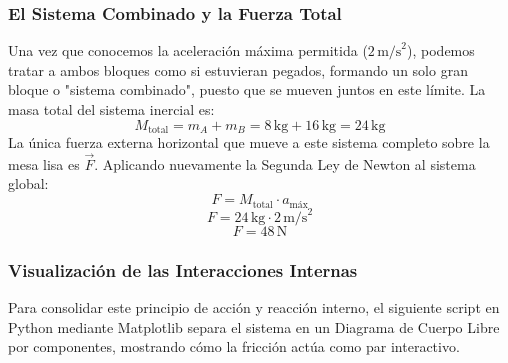 \documentclass[12pt]{article}
\begin{document}
\subsubsection*{El Sistema Combinado y la Fuerza Total}
Una vez que conocemos la aceleración máxima permitida ($2 \, \text{m/s}^2$), podemos tratar a ambos bloques como si estuvieran pegados, formando un solo gran bloque o "sistema combinado", puesto que se mueven juntos en este límite. 
La masa total del sistema inercial es:
\begin{equation}
    M_{\text{total}} = m_A + m_B = 8 \, \text{kg} + 16 \, \text{kg} = 24 \, \text{kg}
\end{equation}
La única fuerza externa horizontal que mueve a este sistema completo sobre la mesa lisa es $\vec{F}$. Aplicando nuevamente la Segunda Ley de Newton al sistema global:
\begin{equation}
    F = M_{\text{total}} \cdot a_{\text{máx}}
\end{equation}
\begin{equation}
    F = 24 \, \text{kg} \cdot 2 \, \text{m/s}^2
\end{equation}
\begin{equation}
    F = 48 \, \text{N}
\end{equation}

\subsubsection*{Visualización de las Interacciones Internas}
Para consolidar este principio de acción y reacción interno, el siguiente script en Python mediante Matplotlib separa el sistema en un Diagrama de Cuerpo Libre por componentes, mostrando cómo la fricción actúa como par interactivo.
\end{document}
